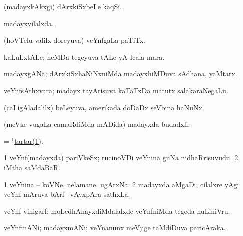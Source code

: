 \bentry
{}
\gl{\nA}
\bmng
(madayxkAkxgi) dArxkiSxbeLe kaqSi. 
\emng
\eentry

\bentry
{}
\gl{\gu}
\bmng
madayxvilalxda. 
\emng
\eentry

\bentry
{}
\gl{\nA}
\bmng
(hoVTelu \mo valilx doreyuva) veYnfgaLa paTiTx. 
\emng
\eentry

\bentry
{}
\gl{\nA}
\bmng
kaLuLxtALe; heMDa tegeyuva tALe yA Icala mara. 
\emng
\eentry

\bentry
{}
\gl{\nA}
\bmng
madayxgANa; dArxkiSxhaNiNxniMda madayxhiMDuva sAdhana, yaMtarx. 
\emng
\eentry

\bentry
{}
\gl{\nA}
\bmng
veYnfsAthxvara; madayx tayArisuva kaTaTxDa matutx salakaraNegaLu. 
\emng
\eentry

\bentry
{}
\gl{\nA}
\bmng
(caLigAladalilx) beLeyuva, amerikada doDaDx seVbina haNuNx. 
\emng
\eentry

\bentry
{}
\gl{\nA}
\bmng
(meVke \mo vugaLa camaRdiMda mADida) madayxda budadxli. 
\emng
\eentry

\bentry
{}
\gl{\nA}
\bmng
= \hyperref{kandict_t.pdf}{T}{tartar(1)}{$^1$tartar(1)}. 
\emng
\eentry

\bentry
{}
\gl{\nA}
\bmng
\bnum
\num{1} veYnf(madayxda) pariVkeSx; rucinoVDi veYnina guNa nidhaRrisuvudu. 
\num{2} iMtha saMdaBaR. 
\enum
\emng
\eentry

\bentry
{}
\gl{\nA}
\bmng
\bnum
\num{1} veYnina -- koVNe, nelamane, ugArxNa. 
\num{2} madayxda aMgaDi; cilalxre yAgi veYnf mAruva bArf \mo\ vAyxpAra sathxLa. 
\enum
\emng
\eentry

\bentry
{}
\gl{\nA}
\bmng
veYnf vinigarf; moLedhAnayxdiMdalalxde veYnfniMda tegeda huLiniVru. 
\emng
\eentry

\bentry
{}
\gl{\nA}
\bmng
veYnfmANi; madayxmANi; veYnanunx meVjige taMdiDuva paricAraka. 
\emng
\eentry

